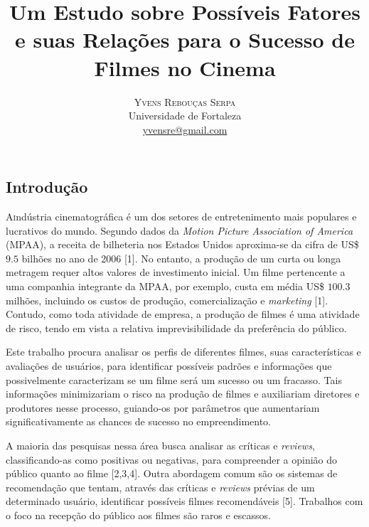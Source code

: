 \documentclass[twoside]{article}
\title{\vspace{-15mm}\fontsize{24pt}{10pt}\selectfont\textbf{Um Estudo sobre Possíveis Fatores e suas Relações para o Sucesso de Filmes no Cinema}} %
\author{
\large
\textsc{Yvens Rebouças Serpa}\\[2mm] %
\normalsize Universidade de Fortaleza \\ %
\normalsize \href{mailto:yvensre@gmail.com}{yvensre@gmail.com} %
\vspace{-5mm}
}
\date{}
\begin{document}
\maketitle %

\thispagestyle{fancy} %


\begin{multicols}{2} %

\section{Introdução}

\lettrine[nindent=0em,lines=3]
A indústria cinematográfica é um dos setores de entretenimento mais populares e lucrativos do mundo. Segundo dados da \textit{Motion Picture Association of America} (MPAA), a receita de bilheteria nos Estados Unidos aproxima-se da cifra de US\$ $9.5$ bilhões no ano de 2006 [1]. No entanto, a produção de um curta ou longa metragem requer altos valores de investimento inicial. Um filme pertencente a uma companhia integrante da MPAA, por exemplo, custa em média US\$ $100.3$ milhões, incluindo os custos de produção, comercialização e \textit{marketing} [1]. Contudo, como toda atividade de empresa, a produção de filmes é uma atividade de risco, tendo em vista a relativa imprevisibilidade da preferência do público.

Este trabalho procura analisar os perfis de diferentes filmes, suas características e avaliações de usuários, para identificar possíveis padrões e informações que possivelmente caracterizam se um filme será um sucesso ou um fracasso. Tais informações minimizariam o risco na produção de filmes e auxiliariam diretores e produtores nesse processo, guiando-os por parâmetros que aumentariam significativamente as chances de sucesso no empreendimento.

A maioria das pesquisas nessa área busca analisar as críticas e \textit{reviews}, classificando-as como positivas ou negativas, para compreender a opinião do público quanto ao filme [2,3,4]. Outra abordagem comum são os sistemas de recomendação que tentam, através das críticas e \textit{reviews} prévias de um determinado usuário, identificar possíveis filmes recomendáveis [5]. Trabalhos com o foco na recepção do público aos filmes são raros e escassos.


\end{multicols}
\end{document}
